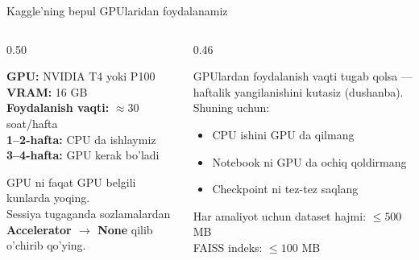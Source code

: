 \documentclass[aspectratio=169,11pt]{beamer}
\begin{document}
\begin{frame}{Kaggle'ning bepul GPUlaridan foydalanamiz}
  \begin{columns}
    \begin{column}{0.50\textwidth}
      \begin{tcolorbox}[defbox,title=Resurslar]
        \small
        \textbf{GPU:} NVIDIA T4 yoki P100\\
        \textbf{VRAM:} 16 GB\\
        \textbf{Foydalanish vaqti:} $\approx$30 soat/hafta\\[4pt]
        \textbf{1--2-hafta:} CPU da ishlaymiz\\
        \textbf{3--4-hafta:} GPU kerak bo'ladi
      \end{tcolorbox}
      \vspace{0.4em}
      \begin{tcolorbox}[okbox,title=Resurslarni tejash uchun]
        \small GPU ni faqat GPU belgili kunlarda yoqing.\\
        Sessiya tugaganda sozlamalardan \textbf{Accelerator $\to$ None} qilib o'chirib qo'ying.
      \end{tcolorbox}
    \end{column}
    \begin{column}{0.46\textwidth}
      \begin{tcolorbox}[warnbox,title=GPUlardan foydalanish vaqti tugasa nima bo'ladi?]
        \small GPUlardan foydalanish vaqti tugab qolsa --- haftalik
        yangilanishini kutasiz (dushanba). Shuning uchun:
        \begin{itemize}\setlength\itemsep{2pt}
          \item CPU ishini GPU da qilmang
          \item Notebook ni GPU da ochiq qoldirmang
          \item Checkpoint ni tez-tez saqlang
        \end{itemize}
      \end{tcolorbox}
      \vspace{0.3em}
      \begin{tcolorbox}[defbox,title=Dataset chegarasi]
        \small Har amaliyot uchun dataset hajmi: $\leq 500$ MB\\
        FAISS indeks: $\leq 100$ MB
      \end{tcolorbox}
    \end{column}
  \end{columns}
\end{frame}
\end{document}
